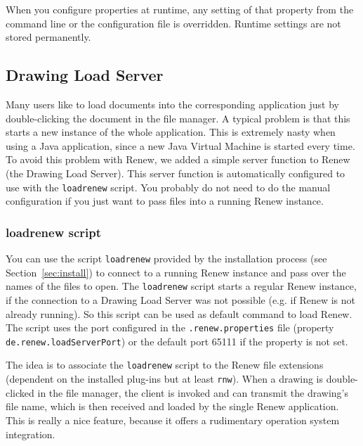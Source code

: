 When you configure properties at runtime, any setting of that property
from the command line or the configuration file is overridden.
Runtime settings are not stored permanently.


\subsection{Drawing Load Server}
\label{subsec:drawingloadserver}

Many users like to load documents into the corresponding
application just by double-clicking the document in
the file manager. A typical problem is that this starts
a new instance of the whole application. This is extremely
nasty when using a Java application, since a new Java Virtual
Machine is started every time.
To avoid this problem with Renew, we added a simple server
function to Renew (the Drawing Load Server). 
This server function is automatically configured to use with the \texttt{loadrenew} script. You probably do not need to do the manual configuration if you just want to pass files into a running Renew instance.


%
%
%


\subsubsection{loadrenew script}

You can use the script \texttt{loadrenew} provided
by the installation process (see Section~\ref{sec:install}) to connect to a running Renew instance and pass over the names of the files to open. The \texttt{loadrenew} script starts a regular Renew instance,
if the connection to a Drawing Load Server was not possible (e.g. if Renew is not already running). So this script can 
be used as default command to load Renew.
The script uses the port configured in the \texttt{.renew.properties}
file (property \texttt{de.renew.loadServerPort}) or the default port 65111 if the property is not set.

The idea is to associate the \texttt{loadrenew} script to the Renew file extensions (dependent on the installed plug-ins but at least \texttt{rnw}).
When a drawing is double-clicked in the file manager,
the client is invoked and can transmit the drawing's file
name, which is then received and loaded by the single
Renew application.
This is really a nice feature, because it offers
a rudimentary operation system integration.


